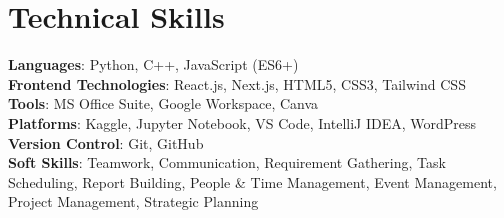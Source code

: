\documentclass[letterpaper,11pt]{article}
\begin{document}
\section{Technical Skills}
\vspace{2pt}
 \begin{itemize}[leftmargin=0.15in, label={}]
    \small{\item{
     \textbf{\color{accentcolor}Languages}{: Python, C++, JavaScript (ES6+)} \\[3pt]
     \textbf{\color{accentcolor}Frontend Technologies}{: React.js, Next.js, HTML5, CSS3, Tailwind CSS} \\[3pt]
     \textbf{\color{accentcolor}Tools}{: MS Office Suite, Google Workspace, Canva} \\[3pt]
     \textbf{\color{accentcolor}Platforms}{: Kaggle, Jupyter Notebook, VS Code, IntelliJ IDEA, WordPress} \\[3pt]
     \textbf{\color{accentcolor}Version Control}{: Git, GitHub} \\[3pt]
     \textbf{\color{accentcolor}Soft Skills}{: Teamwork, Communication, Requirement Gathering, Task Scheduling, Report Building, People \& Time Management, Event Management, Project Management, Strategic Planning}
    }}
 \end{itemize}
 \vspace{-12pt}

\end{document}
